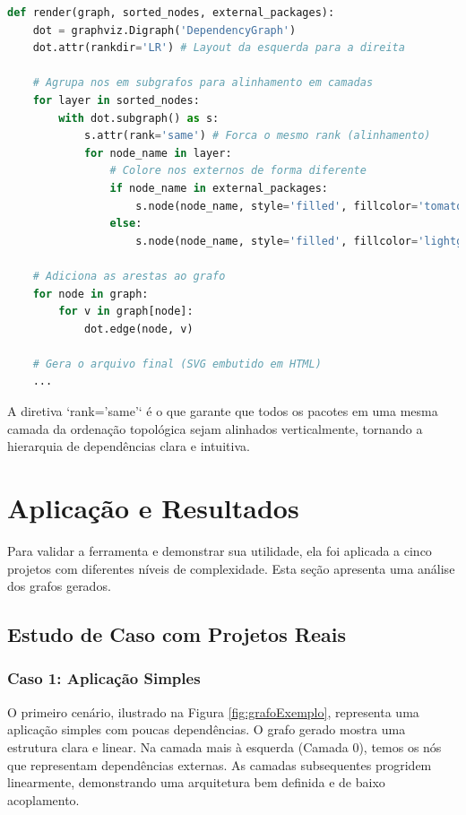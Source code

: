 \documentclass[12pt]{article}
\begin{document}
\begin{lstlisting}[language=Python, caption={Trecho do código de renderização do grafo.}, label={lst:render}]
def render(graph, sorted_nodes, external_packages):
    dot = graphviz.Digraph('DependencyGraph')
    dot.attr(rankdir='LR') # Layout da esquerda para a direita

    # Agrupa nos em subgrafos para alinhamento em camadas
    for layer in sorted_nodes:
        with dot.subgraph() as s:
            s.attr(rank='same') # Forca o mesmo rank (alinhamento)
            for node_name in layer:
                # Colore nos externos de forma diferente
                if node_name in external_packages:
                    s.node(node_name, style='filled', fillcolor='tomato')
                else:
                    s.node(node_name, style='filled', fillcolor='lightgrey')
    
    # Adiciona as arestas ao grafo
    for node in graph:
        for v in graph[node]:
            dot.edge(node, v)
    
    # Gera o arquivo final (SVG embutido em HTML)
    ...
\end{lstlisting}

A diretiva `rank='same'` é o que garante que todos os pacotes em uma mesma camada da ordenação topológica sejam alinhados verticalmente, tornando a hierarquia de dependências clara e intuitiva.

\FloatBarrier

\section{Aplicação e Resultados}
Para validar a ferramenta e demonstrar sua utilidade, ela foi aplicada a cinco projetos com diferentes níveis de complexidade. Esta seção apresenta uma análise dos grafos gerados.

\subsection{Estudo de Caso com Projetos Reais}

\subsubsection{Caso 1: Aplicação Simples}
O primeiro cenário, ilustrado na Figura \ref{fig:grafoExemplo}, representa uma aplicação simples com poucas
dependências. O grafo gerado mostra uma estrutura clara e linear. Na camada mais à esquerda (Camada 0), temos os nós que
representam dependências externas. As camadas subsequentes progridem linearmente, demonstrando uma arquitetura bem definida e de baixo acoplamento.
\end{document}
